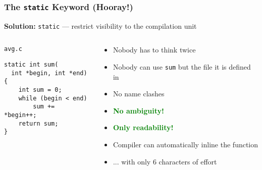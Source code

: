 \begin{frame}[fragile]
  \frametitle{The \texttt{static} Keyword (Hooray!)}

  \textbf{Solution:} \texttt{static} --- restrict visibility to the
  compilation unit

  \begin{columns}[t]

    \begin{column}{.4\textwidth}

      \begin{block}{\texttt{avg.c}}
\begin{verbatim}
static int sum(
  int *begin, int *end)
{
    int sum = 0;
    while (begin < end)
        sum += *begin++;
    return sum;
}
\end{verbatim}
      \end{block}

    \end{column}

    \begin{column}{.5\textwidth}
      \begin{itemize}
      \item Nobody has to think twice
      \item Nobody can use \texttt{sum} but the file it is defined in
      \item No name clashes
      \item \textcolor{green}{\textbf{No ambiguity!}}
      \item \textcolor{green}{\textbf{Only readability!}}
      \item Compiler can automatically inline the function
      \item ... with only 6 characters of effort
      \end{itemize}
    \end{column}

  \end{columns}

\end{frame}
